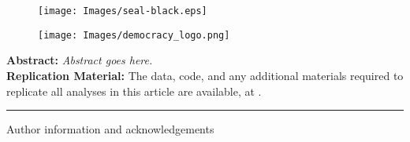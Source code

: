 	\thispagestyle{empty}
\thispagestyle{firstpage}

\begin{flushleft}
\begin{figure}[!htb]
        \begin{minipage}{.2\textwidth}
            \texttt{[image: Images/seal-black.eps]}
        \end{minipage}%
        \begin{minipage}{.65\textwidth}
            \texttt{[image: Images/democracy\_logo.png]}
        \end{minipage}
\end{figure}
\end{flushleft}

\vspace{-0.5in}
\singlespacing 
\noindent
{}
\vspace{-0.1in}
\begin{center}
\begin{minipage}{0.85\textwidth}
\small{\textbf{Abstract: }\textit{%
Abstract goes here.
    }}%
    \vspace{0.5mm} \\

\small{\textbf{Replication Material:} The data, code, and any additional materials required to replicate all analyses in this article are available, at \url{}.} \vspace{-.15in} \\
\end{minipage}
\end{center}

\hrule \vspace{-.1in}

\singlespacing\footnotesize{Author information and acknowledgements}


\normalsize
\restoregeometry
\clearpage

